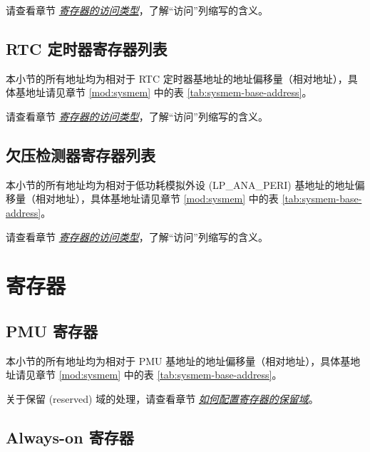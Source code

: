 \documentclass[main\_\_CN.tex]{subfiles}
\begin{document}
请查看章节 \hyperref[glossary-access-types]{\textit{寄存器的访问类型}}，了解“访问”列缩写的含义。



\subsection{RTC 定时器寄存器列表}

本小节的所有地址均为相对于 RTC 定时器基地址的地址偏移量（相对地址），具体基地址请见章节 \ref{mod:sysmem} \textit{} 中的表 \ref{tab:sysmem-base-address}。

请查看章节 \hyperref[glossary-access-types]{\textit{寄存器的访问类型}}，了解“访问”列缩写的含义。



\subsection{欠压检测器寄存器列表}

本小节的所有地址均为相对于低功耗模拟外设 (LP\_ANA\_PERI) 基地址的地址偏移量（相对地址），具体基地址请见章节 \ref{mod:sysmem} \textit{} 中的表 \ref{tab:sysmem-base-address}。

请查看章节 \hyperref[glossary-access-types]{\textit{寄存器的访问类型}}，了解“访问”列缩写的含义。


\clearpage

\section{寄存器}

\subsection{PMU 寄存器}

本小节的所有地址均为相对于 PMU 基地址的地址偏移量（相对地址），具体基地址请见章节 \ref{mod:sysmem} \textit{} 中的表 \ref{tab:sysmem-base-address}。

关于保留 (reserved) 域的处理，请查看章节 \hyperref[programming-reserved-field]{\textit{如何配置寄存器的保留域}}。



\subsection{Always-on 寄存器}
\end{document}
